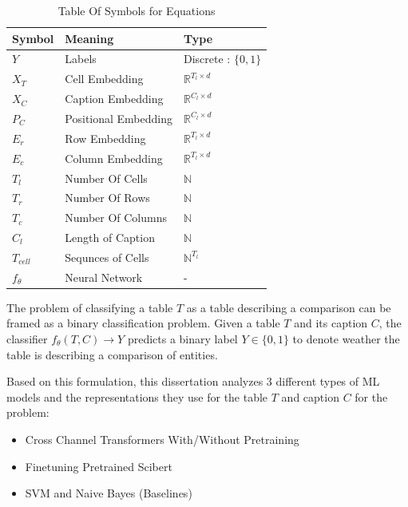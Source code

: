\begin{table}
    \label{table\arabic{tablecounter}}
    \centering
    \begin{tabular}{|l|l|l|}
        \hline
        Symbol & Meaning & Type \\ \hline
        $Y$ & Labels & Discrete : $\{0,1\}$ \\ \hline
        $X_T$ & Cell Embedding & $\mathbb{R}^{T_l \times d}$\\ \hline
        $X_C$ & Caption Embedding & $\mathbb{R}^{C_l \times d}$ \\ \hline
        $P_C$ & Positional Embedding & $\mathbb{R}^{C_l \times d}$ \\ \hline
        $E_r$ & Row Embedding & $\mathbb{R}^{T_l \times d}$ \\ \hline
        $E_c$ & Column Embedding & $\mathbb{R}^{T_l \times d}$ \\ \hline
        $T_l$ & Number Of Cells & $\mathbb{N}$ \\ \hline
        $T_r$ & Number Of Rows & $\mathbb{N}$ \\ \hline
        $T_c$ & Number Of Columns & $\mathbb{N}$ \\ \hline
        $C_l$ & Length of Caption & $\mathbb{N}$ \\ \hline
        $T_{cell}$ & Sequnces of Cells & $\mathbb{N}^{T_l}$ \\ \hline
        $f_\theta$ & Neural Network & - \\ \hline
    \end{tabular}
    \caption{\label{tablecounter} Table Of Symbols for Equations}
\end{table}
The problem of classifying a table $T$ as a table describing a comparison can be framed as a binary classification problem. Given a table $T$ and its caption $C$, the classifier $f_\theta(T,C) \rightarrow Y$ predicts a binary label $Y \in \{0,1\}$ to denote weather the table is describing a comparison of entities. 

Based on this formulation, this dissertation analyzes 3 different types of ML models and the representations they use for the table $T$ and caption $C$ for the problem:
\begin{itemize}
    \item Cross Channel Transformers With/Without Pretraining
    \item Finetuning Pretrained Scibert
    \item SVM and Naive Bayes (Baselines)
\end{itemize}

